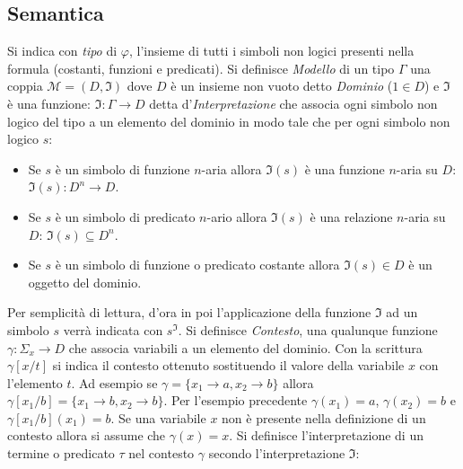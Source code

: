 \documentclass[./main.tex]{subfiles}
\begin{document}
\subsection{Semantica} \label{sec:semantica_fof}
Si indica con \textit{tipo} di $\varphi$, l'insieme di tutti i simboli non logici presenti nella formula (costanti, funzioni e predicati).
Si definisce \textit{Modello} di un tipo $\Gamma$ una coppia $\mathcal{M} = (D, \mathfrak{I})$ dove $D$ è un insieme non vuoto detto \textit{Dominio} ($1 \in D$) e $\mathfrak{I}$ è una funzione: 
$\mathfrak{I}: \Gamma \rightarrow D$ detta d'\textit{Interpretazione} che associa ogni simbolo non logico del tipo a un elemento del dominio in modo tale che per ogni simbolo non logico $s$:

\begin{itemize}
  \item Se $s$ è un simbolo di funzione $n$-aria allora $\mathfrak{I}(s)$ è una funzione $n$-aria su $D$: $\mathfrak{I}(s): D^n \rightarrow D$.
  \item Se $s$ è un simbolo di predicato $n$-ario allora $\mathfrak{I}(s)$ è una relazione $n$-aria su $D$: $\mathfrak{I}(s) \subseteq D^n$.
  \item Se $s$ è un simbolo di funzione o predicato costante allora $\mathfrak{I}(s) \in D$ è un oggetto del dominio.
\end{itemize}

Per semplicità di lettura, d'ora in poi l'applicazione della funzione $\mathfrak{I}$ ad un simbolo $s$ verrà indicata con $s^\mathfrak{I}$.
Si definisce \textit{Contesto}, una qualunque funzione $\gamma : \Sigma_x \rightarrow D$ che associa variabili a un elemento del dominio.
Con la scrittura $\gamma[x/t]$ si indica il contesto ottenuto sostituendo il valore della variabile $x$ con l'elemento $t$.
Ad esempio se $\gamma = \{x_1 \rightarrow a, x_2 \rightarrow b\}$ allora $\gamma[x_1/b] = \{x_1 \rightarrow b, x_2 \rightarrow b\}$.
Per l'esempio precedente $\gamma(x_1) = a$, $\gamma(x_2) = b$ e $\gamma[x_1/b](x_1) = b$.
Se una variabile $x$ non è presente nella definizione di un contesto allora si assume che $\gamma(x) = x$.
Si definisce l'interpretazione di un termine o predicato $\tau$ nel contesto $\gamma$ secondo l'interpretazione $\mathfrak{I}$:
\end{document}
